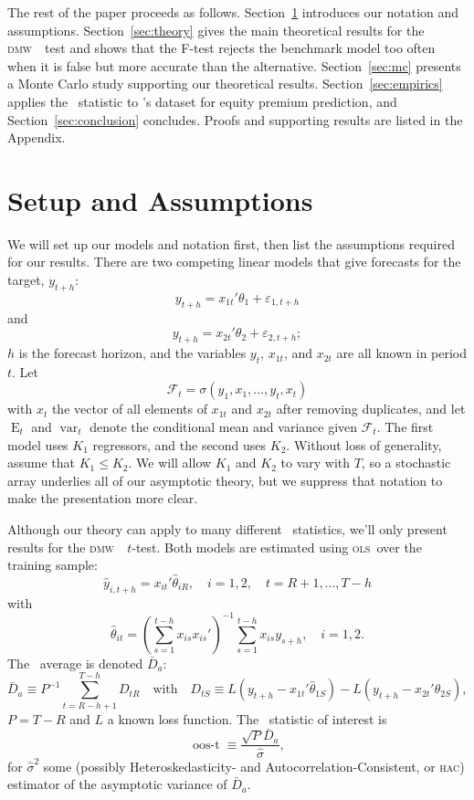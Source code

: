 \documentclass[11pt]{article}
\DeclareMathOperator{\E}{E}
\DeclareMathOperator{\var}{var}
\newcommand{\citepos}[1]{\citeauthor{#1}'s \citeyearpar{#1}}
\newcommand{\oosA}{\bar{D}_a}
\newcommand{\oost}{\ensuremath{\operatorname{oos-t}}}
\newcommand{\oosSum}[2]{\ensuremath{\sum_{#1=R-\h+#2}^{T-\h}}}
\newcommand{\h}{h}
\newcommand{\bh}[1]{\ensuremath{\hat\theta_{#1}}}
\newcommand{\dmw}{\textsc{dmw}}
\newcommand{\ols}{\textsc{ols}}
\newcommand{\hac}{\textsc{hac}}
\begin{document}
The rest of the paper proceeds as follows.
Section~\ref{sec:assumptions} introduces our notation and assumptions.
Section~\ref{sec:theory} gives the main theoretical results for the
\dmw\ \oos\ test and shows that the F-test rejects the benchmark model
too often when it is false but more accurate than the
alternative. Section~\ref{sec:mc} presents a Monte Carlo study
supporting our theoretical results.  Section~\ref{sec:empirics}
applies the \oos\ statistic to \citepos{GoW:08} dataset
for equity premium prediction, and Section~\ref{sec:conclusion}
concludes.  Proofs and supporting results are listed in the Appendix.

\section{Setup and Assumptions}\label{sec:assumptions}
We will set up our models and notation first, then list the assumptions
required for our results.  There are two competing linear models that
give forecasts for the target, $y_{t+\h}$:
\[
y_{t+\h} = x_{1t}'\theta_1 + \varepsilon_{1,t+h}
\]
and
\[
y_{t+\h} = x_{2t}'\theta_2 + \varepsilon_{2,t+h};
\]
$\h$ is the forecast horizon, and the variables $y_t$, $x_{1t}$, and
$x_{2t}$ are all known in period $t$.  Let
\begin{equation*}
  \mathcal{F}_t = \sigma(y_1, x_1, \dots, y_t, x_t)
\end{equation*}
with $x_t$ the vector of all elements of $x_{1t}$ and $x_{2t}$ after
removing duplicates, and let $\E_t$ and $\var_t$ denote the
conditional mean and variance given $\mathcal{F}_t$.  The first model
uses $K_1$ regressors, and the second uses $K_2$.  Without loss of
generality, assume that $K_1 \leq K_2$.  We will allow $K_1$ and $K_2$
to vary with $T$, so a stochastic array underlies all of our
asymptotic theory, but we suppress that notation to make the
presentation more clear.

Although our theory can apply to many different \oos\ statistics,
we'll only present results for the \dmw\ \oos\ $t$-test.  Both models
are estimated using \ols\ over the training sample:
\[
\hat y_{i,t+\h} = x_{it}'\bh{iR}, \quad i=1,2, \quad t = R+1,\dots,T-h
\]
with
\[
\bh{it} = (\sum_{s=1}^{t-\h} x_{is}x_{is}')^{-1} \sum_{s=1}^{t-\h} x_{is} y_{s+\h},
\quad i=1,2.
\]
The \oos\ average is denoted $\oosA$:
\[
\oosA \equiv P^{-1} \oosSum{t}{1} D_{tR}
\quad \text{with} \quad D_{tS} \equiv L(y_{t+\h} - x_{1t}'\bh{1S}) -
L(y_{t+\h} - x_{2t}'\bh{2S}),
\]
$P = T - R$ and $L$ a known loss function.  The \oos\ statistic
of interest is 
\[
\oost \equiv \frac{\sqrt{P} \oosA}{\hat\sigma},
\]
for $\hat\sigma^2$ some (possibly Heteroskedasticity- and
Autocorrelation-Consistent, or \hac) estimator of the asymptotic
variance of $\oosA$.
\end{document}
